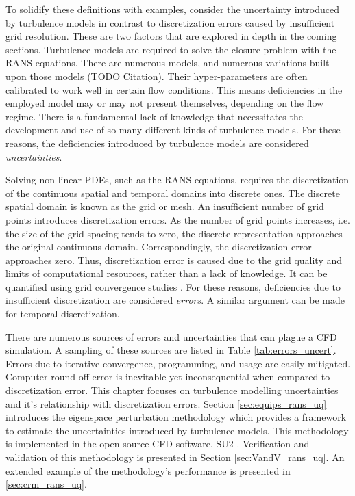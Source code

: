 To solidify these definitions with examples, consider the uncertainty introduced by turbulence models in contrast to discretization errors caused by insufficient grid resolution. These are two factors that are explored in depth in the coming sections. Turbulence models are required to solve the closure problem with the RANS equations. There are numerous models, and numerous variations built upon those models (TODO Citation). Their hyper-parameters are often calibrated to work well in certain flow conditions. This means deficiencies in the employed model may or may not present themselves, depending on the flow regime. There is a fundamental lack of knowledge that necessitates the development and use of so many different kinds of turbulence models. For these reasons, the deficiencies introduced by turbulence models are considered \textit{uncertainties}.

Solving non-linear PDEs, such as the RANS equations, requires the discretization of the continuous spatial and temporal domains into discrete ones. The discrete spatial domain is known as the grid or mesh. An insufficient number of grid points introduces discretization errors. As the number of grid points increases, i.e. the size of the grid spacing tends to zero, the discrete representation approaches the original continuous domain. Correspondingly, the discretization error approaches zero. Thus, discretization error is caused due to the grid quality and limits of computational resources, rather than a lack of knowledge. It can be quantified using grid convergence studies \cite{american_society_of_mechanical_engineers_standard_2009}. For these reasons, deficiencies due to insufficient discretization are considered \textit{errors}. A similar argument can be made for temporal discretization.

There are numerous sources of errors and uncertainties that can plague a CFD simulation. A sampling of these sources are listed in Table \ref{tab:errors_uncert}. Errors due to iterative convergence, programming, and usage are easily mitigated. Computer round-off error is inevitable yet inconsequential when compared to discretization error. This chapter focuses on turbulence modelling uncertainties and it's relationship with discretization errors. Section \ref{sec:equips_rans_uq} introduces the eigenspace perturbation methodology which provides a framework to estimate the uncertainties introduced by turbulence models. This methodology is implemented in the open-source CFD software, SU2 \cite{su2_aiaajournal}. Verification and validation of this methodology is presented in Section \ref{sec:VandV_rans_uq}. An extended example of the methodology's performance is presented in \ref{sec:crm_rans_uq}. 

